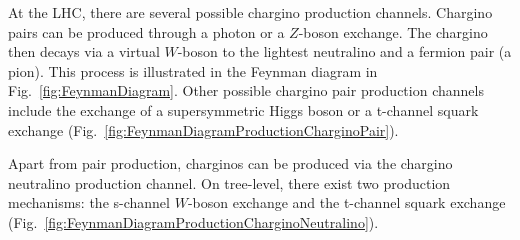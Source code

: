 At the LHC, there are several possible chargino production channels. 
Chargino pairs can be produced through a photon or a $Z$-boson exchange. 
The chargino then decays via a virtual $W$-boson to the lightest neutralino and a fermion pair (\eg a pion). 
This process is illustrated in the Feynman diagram in Fig.~\ref{fig:FeynmanDiagram}.
Other possible chargino pair production channels include the exchange of a supersymmetric Higgs boson or a t-channel squark exchange (Fig.~\ref{fig:FeynmanDiagramProductionCharginoPair}).

Apart from pair production, charginos can be produced via the chargino neutralino production channel. 
On tree-level, there exist two production mechanisms: the s-channel $W$-boson exchange and the t-channel squark exchange (Fig.~\ref{fig:FeynmanDiagramProductionCharginoNeutralino}).

